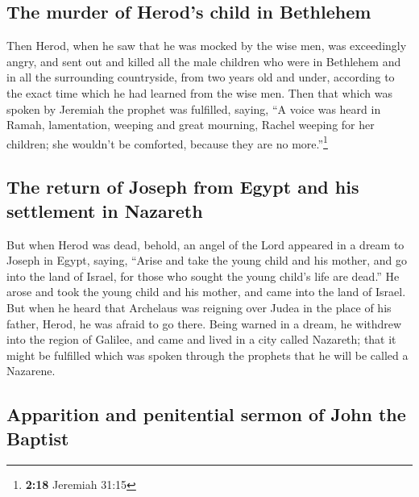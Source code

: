 \hypertarget{the-murder-of-herods-child-in-bethlehem}{%
\subsection{The murder of Herod's child in
Bethlehem}\label{the-murder-of-herods-child-in-bethlehem}}

 Then Herod, when he saw that he was mocked by the wise
men, was exceedingly angry, and sent out and killed all the male
children who were in Bethlehem and in all the surrounding countryside,
from two years old and under, according to the exact time which he had
learned from the wise men.  Then that which was spoken by
Jeremiah the prophet was fulfilled, saying,  ``A voice
was heard in Ramah, lamentation, weeping and great mourning, Rachel
weeping for her children; she wouldn't be comforted, because they are no
more.''\footnote{\textbf{2:18} Jeremiah 31:15}

\hypertarget{the-return-of-joseph-from-egypt-and-his-settlement-in-nazareth}{%
\subsection{The return of Joseph from Egypt and his settlement in
Nazareth}\label{the-return-of-joseph-from-egypt-and-his-settlement-in-nazareth}}

 But when Herod was dead, behold, an angel of the Lord
appeared in a dream to Joseph in Egypt, saying,  ``Arise
and take the young child and his mother, and go into the land of Israel,
for those who sought the young child's life are dead.'' 
He arose and took the young child and his mother, and came into the land
of Israel.  But when he heard that Archelaus was reigning
over Judea in the place of his father, Herod, he was afraid to go there.
Being warned in a dream, he withdrew into the region of Galilee,
 and came and lived in a city called Nazareth; that it
might be fulfilled which was spoken through the prophets that he will be
called a Nazarene.

\hypertarget{apparition-and-penitential-sermon-of-john-the-baptist}{%
\subsection{Apparition and penitential sermon of John the
Baptist}\label{apparition-and-penitential-sermon-of-john-the-baptist}}


